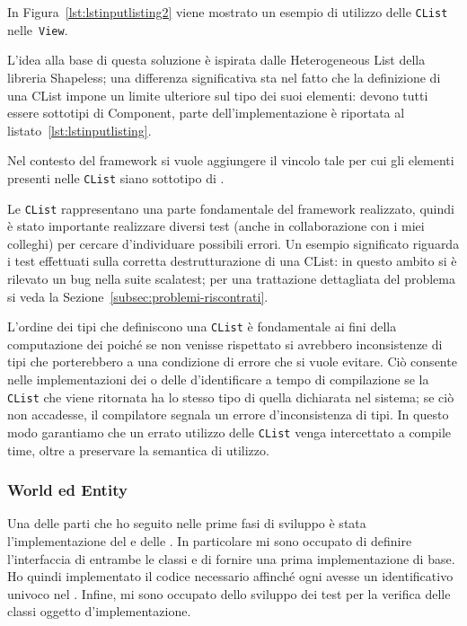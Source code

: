 In Figura~\ref{lst:lstinputlisting2} viene mostrato un esempio di utilizzo delle \texttt{CList} nelle~\texttt{View}.


L’idea alla base di questa soluzione è ispirata dalle Heterogeneous List della libreria
Shapeless\cite{shapeless}; una differenza significativa sta nel fatto che la definizione di una CList impone un
limite ulteriore sul tipo dei suoi elementi: devono tutti essere sottotipi di Component, parte dell’implementazione è
riportata al listato~\ref{lst:lstinputlisting}.



Nel contesto del framework si vuole aggiungere il vincolo tale per cui gli elementi presenti nelle \texttt{CList} siano
sottotipo di \Component.

Le \texttt{CList} rappresentano una parte fondamentale del framework realizzato, quindi è stato importante realizzare
diversi test (anche in collaborazione con i miei colleghi) per cercare d'individuare possibili errori.
Un esempio significato riguarda i test effettuati sulla corretta destrutturazione di una CList: in questo ambito si è
rilevato un bug nella suite scalatest;
per una trattazione dettagliata del problema si veda la Sezione~\ref{subsec:problemi-riscontrati}.

L'ordine dei tipi che definiscono una \texttt{CList} è fondamentale ai fini della computazione dei \System poiché se non
venisse rispettato si avrebbero inconsistenze di tipi che porterebbero a una condizione di errore che si vuole evitare.
Ciò consente nelle implementazioni dei \System o delle \View d'identificare a tempo di compilazione se la
\texttt{CList} che viene ritornata ha lo stesso tipo di quella dichiarata nel sistema;
se ciò non accadesse, il compilatore segnala un errore d'inconsistenza di tipi.
In questo modo garantiamo che un errato utilizzo delle \texttt{CList} venga intercettato a compile time, oltre a
preservare la semantica di utilizzo.

\subsubsection{World ed Entity}
Una delle parti che ho seguito nelle prime fasi di sviluppo è stata l'implementazione del \World e delle \Entity.
In particolare mi sono occupato di definire l'interfaccia di entrambe le classi e di fornire una prima implementazione
di base.
Ho quindi implementato il codice necessario affinché ogni \Entity avesse un identificativo univoco nel \World.
Infine, mi sono occupato dello sviluppo dei test per la verifica delle classi oggetto d'implementazione.

